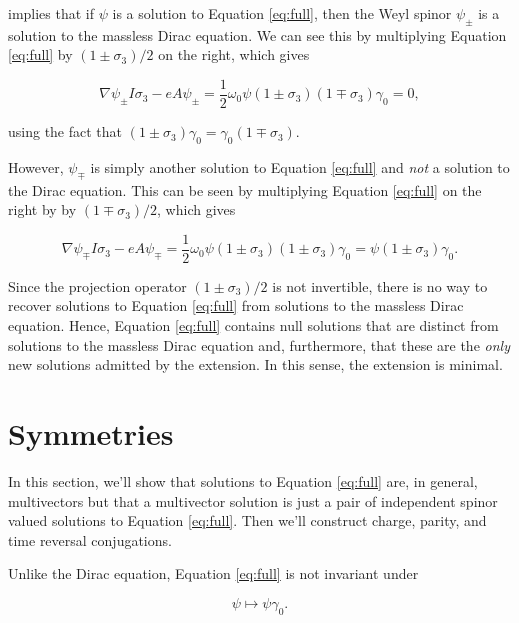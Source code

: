 \documentclass{article}
\begin{document}
  implies that if $\psi$ is a solution to Equation \ref{eq:full}, then the Weyl spinor $\psi_\pm$ is a solution to the massless Dirac equation. We can see this by multiplying Equation \ref{eq:full} by $(1 \pm \sigma_3)/2$ on the right, which gives

  \begin{equation}
    \nabla \psi_\pm I \sigma_3 - e A \psi_\pm = \frac{1}{2} \omega_0 \psi (1 \pm \sigma_3)(1 \mp \sigma_3) \gamma_0 = 0,
  \end{equation}

  using the fact that $(1 \pm \sigma_3) \gamma_0 = \gamma_0 (1 \mp \sigma_3)$.

  However, $\psi_\mp$ is simply another solution to Equation \ref{eq:full} and \emph{not} a solution to the Dirac equation. This can be seen by multiplying Equation \ref{eq:full} on the right by by $(1 \mp \sigma_3)/2$, which gives

  \begin{equation}
    \nabla \psi_\mp I \sigma_3 - e A \psi_\mp = \frac{1}{2} \omega_0 \psi(1 \pm \sigma_3)(1 \pm \sigma_3) \gamma_0 = \psi(1 \pm \sigma_3) \gamma_0.
  \end{equation}

  Since the projection operator $(1 \pm \sigma_3)/2$ is not invertible, there is no way to recover solutions to Equation \ref{eq:full} from solutions to the massless Dirac equation. Hence, Equation \ref{eq:full} contains null solutions that are distinct from solutions to the massless Dirac equation and, furthermore, that these are the \emph{only} new solutions admitted by the extension. In this sense, the extension is minimal.

  \section{Symmetries} \label{symmetries}

  In this section, we'll show that solutions to Equation \ref{eq:full} are, in general, multivectors but that a multivector solution is just a pair of independent spinor valued solutions to Equation \ref{eq:full}. Then we'll construct charge, parity, and time reversal conjugations.

  Unlike the Dirac equation, Equation \ref{eq:full} is not invariant under

  \begin{equation}
    \psi \mapsto \psi \gamma_0.\label{eq:g0conjugation}
  \end{equation}
\end{document}
